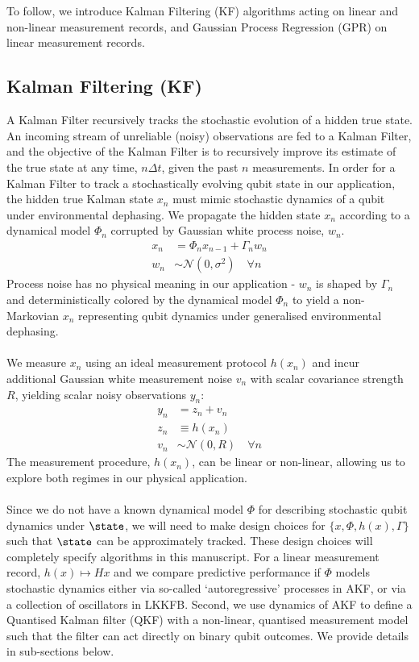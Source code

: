 \\
\\
To follow, we introduce Kalman Filtering (KF) algorithms acting on linear and non-linear measurement records, and Gaussian Process Regression (GPR) on linear measurement records. 

\subsection{ Kalman Filtering (KF)}

A Kalman Filter recursively tracks the stochastic evolution of a hidden true state. An incoming stream of unreliable (noisy) observations are fed to a Kalman Filter, and the objective of the Kalman Filter is to recursively improve its estimate of the true state at any time, $n\Delta t$, given the past $n$ measurements. In order for a Kalman Filter to track a stochastically evolving qubit state in our application, the hidden true Kalman state $x_n$ must mimic stochastic dynamics  of a qubit under environmental dephasing. We propagate the hidden state $x_n$ according to a dynamical model $\Phi_n$ corrupted by Gaussian white process  noise, $w_n$.  
\begin{align}
x_n & = \Phi_n x_{n-1} + \Gamma_n w_n \label{eqn:KF:dynamics} \\
w_n & \sim \mathcal{N}(0, \sigma^2) \quad \forall n 
\end{align}
Process noise has no physical meaning in our application - $w_n$ is shaped by $\Gamma_n$ and deterministically colored by the dynamical model $\Phi_n$ to yield a non-Markovian $x_n$ representing qubit dynamics under generalised environmental dephasing. 
\\
\\
We measure $x_n$ using an ideal measurement protocol $h(x_n)$ and incur additional Gaussian white measurement noise $v_n$ with scalar covariance strength $R$, yielding scalar noisy observations $y_n$:
\begin{align}
y_n &= z_n + v_n \\
z_n & \equiv  h(x_n) \\
v_n & \sim \mathcal{N}(0, R) \quad \forall n
\end{align}
The measurement procedure, $h(x_n)$, can be linear or non-linear, allowing us to explore both regimes in our physical application.
\\
\\
Since we do not have a known dynamical model $\Phi$ for describing stochastic qubit dynamics under $\state$, we will need to make design choices for  $\{ x, \Phi, h(x), \Gamma \}$  such that $\state$ can be approximately tracked. These design choices will completely specify algorithms in this manuscript. For a linear measurement record,   $h(x) \mapsto Hx$ and we compare predictive performance if $\Phi$ models stochastic dynamics either via so-called `autoregressive' processes in AKF, or via a collection of oscillators in LKKFB. Second, we use dynamics of AKF to define a Quantised Kalman filter (QKF) with a non-linear, quantised measurement model such that the filter can act directly on binary qubit outcomes. We provide details in sub-sections below. 
 
